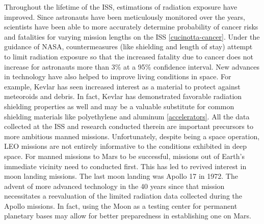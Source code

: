 Throughout the lifetime of the ISS, estimations of radiation exposure have improved. Since astronauts have been meticulously monitored over the years, scientists have been able to more accurately determine probability of cancer risks and fatalities for varying mission lengths on the ISS \ref{cucinotta-cancer}. Under the guidance of NASA, countermeasures (like shielding and length of stay) attempt to limit radiation exposure so that the increased fatality due to cancer does not increase for astronauts more than 3\% at a 95\% confidence interval. New advances in technology have also helped to improve living conditions in space. For example, Kevlar has seen increased interest as a material to protect against meteoroids and debris. In fact, Kevlar has demonstrated favorable radiation shielding properties as well and may be a valuable substitute for common shielding materials like polyethylene and aluminum \ref{accelerators}. All the data collected at the ISS and research conducted therein are important precursors to more ambitious manned missions. Unfortunately, despite being a space operation, LEO missions are not entirely informative to the conditions exhibited in deep space. For manned missions to Mars to be successful, missions out of Earth’s immediate vicinity need to conducted first. This has led to revived interest in moon landing missions. The last moon landing was Apollo 17 in 1972. The advent of more advanced technology in the 40 years since that mission necessitates a reevaluation of the limited radiation data collected during the Apollo missions. In fact, using the Moon as a testing center for permanent planetary bases may allow for better preparedness in establishing one on Mars.
